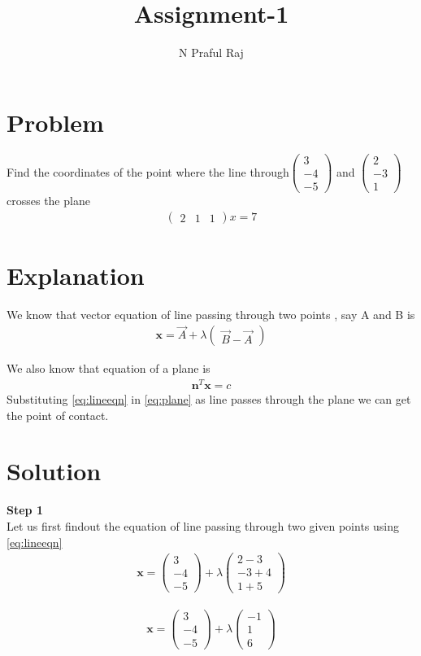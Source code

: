 \documentclass[10pt,a4paper,twocolumn]{article}
\author{N Praful Raj}
\title{\textbf{Assignment-1}}
\newcommand{\myvec}[1]{\ensuremath{\begin{pmatrix}#1\end{pmatrix}}}
\numberwithin{equation}{section}
\begin{document}
\maketitle



	
\section{Problem}
Find the coordinates of the point where the line through$ \myvec{3 \\-4 \\-5}$ and $\myvec{2 \\-3 \\1}$ crosses the plane \begin{align}\myvec{2 & 1 & 1}x=7 \end{align}

\section{Explanation}\label{Explanation}
We know that vector equation of line passing through two points , say A and B is
\begin{align}
\textbf{x} = \vec{A}+\lambda\myvec{\vec{B}-\vec{A}}\label{eq:lineeqn}
\end{align}

We also know that equation of a plane is 
\begin{align}
\textbf{n}^T\textbf{x}=c\label{eq:plane}
\end{align}
Substituting \eqref{eq:lineeqn} in \eqref{eq:plane} as line passes through the plane we can get the point of contact.

\section{Solution}
\textbf{Step 1}\\
Let us first findout the equation of line passing through two given points using \eqref{eq:lineeqn}
\begin{align}
\textbf{x}=\myvec{3 \\-4 \\-5}+\lambda 
\myvec{2-3 \\-3+4 \\1+5}
\end{align}

\begin{align}
\textbf{x}=\myvec{3 \\-4 \\-5}+\lambda 
\myvec{-1 \\1 \\6}\label{eq:lineval}
\end{align}
\end{document}
